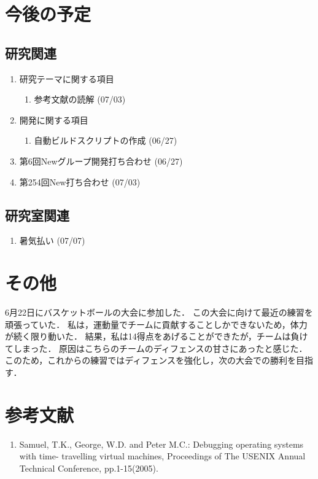 \documentclass[fleqn, 14pt]{extarticle}
\begin{document}
\section{今後の予定}
\label{sec-4}
\subsection{研究関連}
\label{sec-4-1}

\begin{enumerate}
\item 研究テーマに関する項目
\hfill
\begin{enumerate}


\item 参考文献の読解
\hfill
(07/03)

\end{enumerate}
\item 開発に関する項目
\hfill
\begin{enumerate}

\item 自動ビルドスクリプトの作成
\hfill
(06/27)

\end{enumerate}
\item 第6回Newグループ開発打ち合わせ
\hfill
\label{enum-7}
(06/27)
\item 第254回New打ち合わせ
\hfill
\label{enum-3}
(07/03)
\end{enumerate}

\subsection{研究室関連}
\label{sec-4-2}

\begin{enumerate}

\item 暑気払い
\hfill
\label{enum-6}
(07/07)

\end{enumerate}
\section{その他}
6月22日にバスケットボールの大会に参加した．
この大会に向けて最近の練習を頑張っていた．
私は，運動量でチームに貢献することしかできないため，体力が続く限り動いた．
結果，私は14得点をあげることができたが，チームは負けてしまった．
原因はこちらのチームのディフェンスの甘さにあったと感じた．
このため，これからの練習ではディフェンスを強化し，次の大会での勝利を目指す．





\section{参考文献}
\renewcommand{\labelenumi}{[\arabic{enumi}]}
\begin{enumerate}
\item Samuel, T.K., George, W.D. and Peter M.C.: Debugging operating systems with time-
travelling virtual machines, Proceedings of The USENIX Annual Technical Conference,
pp.1-15(2005).
\end{enumerate}
\end{document}
